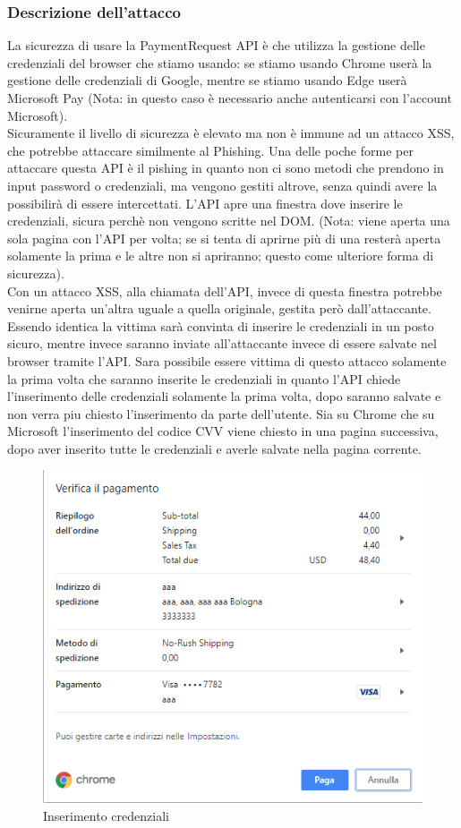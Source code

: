 \documentclass[11pt ,a4paper , twoside , openright ]{article}
\begin{document}
	\subsubsection{Descrizione dell'attacco}
	La sicurezza di usare la PaymentRequest API è che utilizza la gestione delle credenziali del browser che stiamo usando: se stiamo usando Chrome userà la gestione delle credenziali di Google, mentre se stiamo usando Edge userà Microsoft Pay (Nota: in questo caso è necessario anche autenticarsi con l'account Microsoft). \\
	Sicuramente il livello di sicurezza è elevato ma non è immune ad un attacco XSS, che potrebbe attaccare similmente al Phishing. Una delle poche forme per attaccare questa API è il pishing in quanto non ci sono metodi che prendono in input password o credenziali, ma vengono gestiti altrove, senza quindi avere la possibilirà di essere intercettati.
	L'API apre una finestra dove inserire le credenziali, sicura perchè non vengono scritte nel DOM. 
	(Nota: viene aperta una sola pagina con l'API per volta; se si tenta di aprirne più di una resterà aperta solamente la prima e le altre non si apriranno; questo come ulteriore forma di sicurezza).
	\\
	Con un attacco XSS, alla chiamata dell'API, invece di questa finestra potrebbe venirne aperta un'altra uguale a quella originale, gestita però dall'attaccante. Essendo identica la vittima sarà convinta di inserire le credenziali in un posto sicuro, mentre invece saranno inviate all'attaccante invece di essere salvate nel browser tramite l'API.
	Sara possibile essere vittima di questo attacco solamente la prima volta che saranno inserite le credenziali in quanto l'API chiede l'inserimento delle credenziali solamente la prima volta, dopo saranno salvate e non verra piu chiesto l'inserimento da parte dell'utente.
	Sia su Chrome che su Microsoft l'inserimento del codice CVV viene chiesto in una pagina successiva, dopo aver inserito tutte le credenziali e averle salvate nella pagina corrente. 
	\begin{figure}[h]
		\centering
		\includegraphics[width=0.5\linewidth]{Chrome1}
		\caption{Inserimento credenziali}
		\label{fig: Inserimento credenziali}
	\end{figure}
\end{document}
